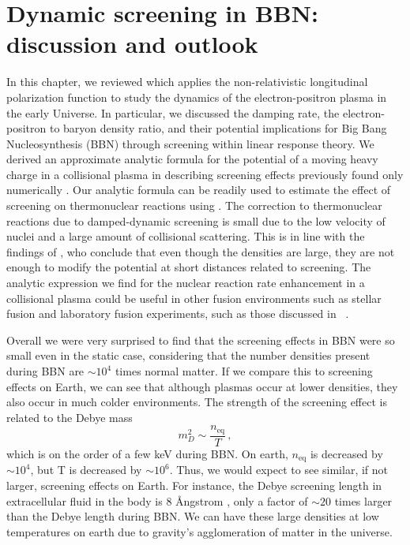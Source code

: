 \section{Dynamic screening in BBN: discussion and outlook}\label{sec:Discussion}

In this chapter, we reviewed \citep{Grayson:2023flr} which applies the non-relativistic longitudinal polarization function to study the dynamics of the electron-positron plasma in the early Universe. In particular, we discussed the damping rate, the electron-positron to baryon density ratio, and their potential implications for Big Bang Nucleosynthesis (BBN) through screening within linear response theory. We derived an approximate analytic formula for the potential of a moving heavy charge in a collisional plasma in  describing screening effects previously found only numerically \citep{Hwang:2021kno}. Our analytic formula can be readily used to estimate the effect of screening on thermonuclear reactions using . The correction to thermonuclear reactions due to damped-dynamic screening is small due to the low velocity of nuclei and a large amount of collisional scattering. This is in line with the findings of \cite{Hwang:2021kno}, who conclude that even though the densities are large, they are not enough to modify the potential at short distances related to screening. The analytic expression we find for the nuclear reaction rate enhancement  in a collisional plasma could be useful in other fusion environments such as stellar fusion and laboratory fusion experiments, such as those discussed in ~\citep{Labaune:2013dla, Margarone:2022mdpi}.

Overall we were very surprised to find that the screening effects in BBN were so small even in the static case,  considering that the number densities present during BBN are $\sim 10^4$ times normal matter. If we compare this to screening effects on Earth, we can see that although plasmas occur at lower densities, they also occur in much colder environments. The strength of the screening effect is related to the Debye mass
\begin{equation}
m_D^2 \sim \frac{n_\text{eq} }{T}\,,
\end{equation}
which is on the order of a few keV during BBN. On earth, $n_\text{eq}$ is decreased by $\sim 10^4$, but T is decreased by $\sim 10^6$. Thus, we would expect to see similar, if not larger, screening effects on Earth. For instance, the Debye screening length in extracellular fluid in the body is 8 \AA ngstrom \citep{doi:10.1073/pnas.1914599117}, only a factor of $\sim 20$ times larger than the Debye length during BBN. We can have these large densities at low temperatures on earth due to gravity's agglomeration of matter in the universe.
